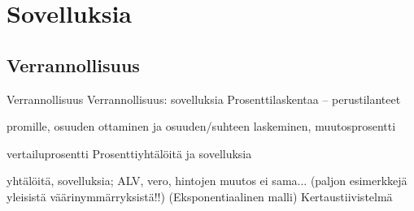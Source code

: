 %
\part{Sovelluksia}
%
%
\chapter{Verrannollisuus}

Verrannollisuus
Verrannollisuus: sovelluksia
Prosenttilaskentaa – perustilanteet

promille, osuuden ottaminen ja osuuden/suhteen laskeminen, muutosprosentti

vertailuprosentti
Prosenttiyhtälöitä ja sovelluksia

yhtälöitä, sovelluksia; ALV, vero, hintojen muutos ei sama... (paljon     esimerkkejä yleisistä väärinymmärryksistä!!)
(Eksponentiaalinen malli)
Kertaustiivistelmä

